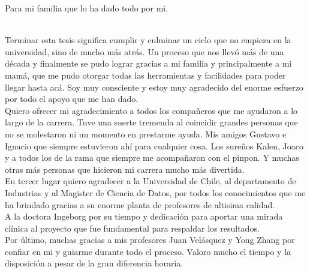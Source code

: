 \documentclass[
	spanish, %
	letterpaper, oneside
]{book}
\begin{document}
\begin{dedicatory}
	Para mi familia que lo ha dado todo por mi. \\	~ \\
\end{dedicatory}

\begin{acknowledgments}

Terminar esta tesis significa cumplir y culminar un ciclo que no empieza en la universidad, sino de mucho más atrás. Un proceso que nos llevó más de una década y finalmente se pudo lograr gracias a mi familia y principalmente a mi mamá, que me pudo otorgar todas las herramientas y facilidades para poder llegar hasta acá. Soy muy consciente y estoy muy agradecido del enorme esfuerzo por todo el apoyo que me han dado.\\

Quiero ofrecer mi agradecimiento a todos los compañeros que me ayudaron a lo largo de la carrera. Tuve una suerte tremenda al coincidir grandes personas que no se molestaron ni un momento en prestarme ayuda. Mis amigos Gustavo e Ignacio que siempre estuvieron ahí para cualquier cosa. Los sureños Kalen, Joaco y a todos los de la rama que siempre me acompañaron con el pinpon. Y muchas otras más personas que hicieron mi carrera mucho más divertida.\\

En tercer lugar quiero agradecer a la Universidad de Chile, al departamento de Industrias y al Magister de Ciencia de Datos, por todos los conocimientos que me ha brindado gracias a su enorme planta de profesores de altisima calidad.\\

A la doctora Ingeborg por su tiempo y dedicación para aportar una mirada clínica al proyecto que fue fundamental para respaldar los resultados.\\

Por último, muchas gracias a mis profesores Juan Velásquez y Yong Zhang por confiar en mi y guiarme durante todo el proceso. Valoro mucho el tiempo y la disposición a pesar de la gran diferencia horaria.
\end{acknowledgments}

\templateIndex

\templateFinalcfg










\backmatter

{\small
\setlength{\bibsep}{2pt plus 1pt minus 1pt}

}


\end{document}
